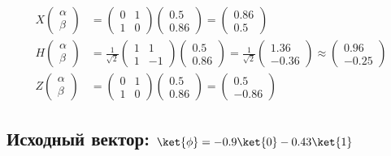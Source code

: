 \documentclass{article}
\begin{document}
\begin{align}
  X\begin{pmatrix} \alpha \\ \beta\end{pmatrix} &=
  \begin{pmatrix} 0 & 1 \\ 1 & 0 \end{pmatrix}
  \begin{pmatrix} 0.5 \\ 0.86 \end{pmatrix} =
  \begin{pmatrix} 0.86 \\ 0.5 \end{pmatrix}
\\
  H\begin{pmatrix} \alpha \\ \beta\end{pmatrix} &=
  \frac{1}{\sqrt2}\begin{pmatrix} 1 & 1 \\ 1 & -1 \end{pmatrix}
  \begin{pmatrix} 0.5 \\ 0.86 \end{pmatrix} =
  \frac{1}{\sqrt2}\begin{pmatrix} 1.36 \\ -0.36 \end{pmatrix}
  \approx \begin{pmatrix} 0.96 \\ -0.25 \end{pmatrix}
\\
  Z\begin{pmatrix} \alpha \\ \beta\end{pmatrix} &=
  \begin{pmatrix} 0 & 1 \\ 1 & 0 \end{pmatrix}
  \begin{pmatrix} 0.5 \\ 0.86 \end{pmatrix} =
  \begin{pmatrix} 0.5 \\ -0.86 \end{pmatrix}
\end{align}

\subsection{Исходный вектор: $\ket{\phi} = -0.9\ket{0}-0.43\ket{1}$}
\end{document}

